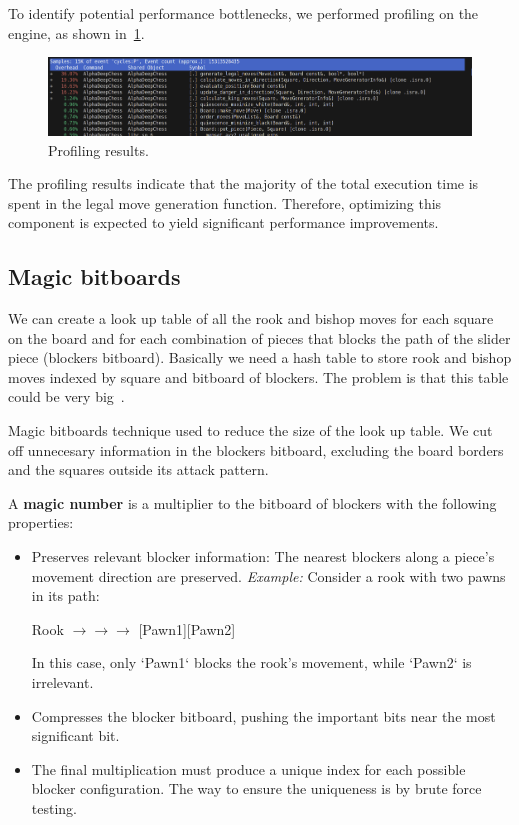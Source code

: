 To identify potential performance bottlenecks, we performed profiling on the engine, as shown in~\cref{fig:profiling}.

\vspace{1em}

\begin{figure}
    \centering
    \includegraphics[width=1.0\textwidth]{Imagenes/basic_move_generator_profiling.png}
    \caption{Profiling results.}\label{fig:profiling}
\end{figure}

\noindent The profiling results indicate that the majority of the total execution time is spent in the legal move generation function. Therefore, optimizing this component is expected to yield significant performance improvements.

\subsection{Magic bitboards}

We can create a look up table of all the rook and bishop moves for each square on the board and for each combination of pieces that blocks the path of the slider piece (blockers  bitboard). Basically we need a hash table to store rook and bishop moves indexed by square and bitboard of blockers. The problem is that this table could be very big~\cite{MagicBitboards}.

\vspace{1em}

\noindent Magic bitboards technique used to reduce the size of the look up table. We cut off unnecesary information in the blockers bitboard, excluding the board borders and the squares outside its attack pattern.

\vspace{1em}

\noindent A \textbf{magic number} is a multiplier to the bitboard of blockers with the following properties:

\begin{itemize}[itemsep=1pt]
  \item Preserves relevant blocker information: 
  The nearest blockers along a piece's movement direction are preserved. 
  \textit{Example:} Consider a rook with two pawns in its path:
  \begin{center}
    Rook $\rightarrow \rightarrow \rightarrow$ [Pawn1][Pawn2]
  \end{center}
  In this case, only `Pawn1` blocks the rook's movement, while `Pawn2` is irrelevant.
  \item Compresses the blocker bitboard, pushing the important bits near the most significant bit.
  \item The final multiplication must produce a unique index for each possible blocker configuration. The way to ensure the uniqueness is by brute force testing.
\end{itemize}

